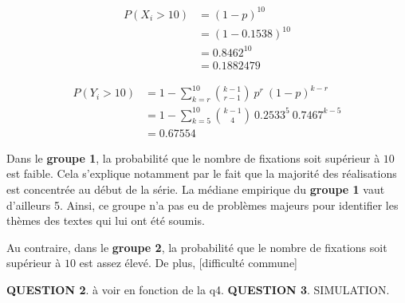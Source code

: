 \documentclass[a4paper,11pt]{article}
\newcommand{\quest}[1]{\small\textbf{#1}\normalsize}
\theoremstyle{nonumberplain}
\theoremstyle{nonumberplain}
\theoremstyle{nonumberplain}
\theoremstyle{nonumberplain}
\begin{document}
          \begin{calculs}
              \vspace{-2ex}
              \begin{equation*}
              \begin{split}
                  P(X_i > 10) & = (1 - p)^{10} \\
                              & = (1 - 0.1538)^{10} \\
                              & = 0.8462^{10} \\
                              & = 0.1882479
              \end{split}
              \end{equation*}

              \begin{equation*}
              \begin{split}
                  P(Y_i > 10) & = 1 - \sum\limits_{k = r}^{10} \binom{k - 1}{r - 1}\ p^r\ (1 - p)^{k - r} \\
                              & = 1 - \sum\limits_{k = 5}^{10} \binom{k - 1}{4}\ 0.2533^5\ 0.7467^{k - 5} \\
                              & = 0.67554
              \end{split}
              \end{equation*}
          \end{calculs}

     \bigskip
     \bigskip
     Dans le \textbf{groupe 1}, la probabilité que le nombre de fixations soit supérieur à $10$ est faible.
     Cela s'explique notamment par le fait que la majorité des réalisations est concentrée au début de la série.
     La médiane empirique du \textbf{groupe 1} vaut d'ailleurs 5. Ainsi, ce groupe n'a pas eu de problèmes majeurs pour
     identifier les thèmes des textes qui lui ont été soumis.

     \bigskip
     Au contraire, dans le \textbf{groupe 2}, la probabilité que le nombre de
     fixations soit supérieur à $10$ est assez élevé. De plus, [difficulté commune]


      \vspace{8cm}
      \quest{QUESTION 2}. à voir en fonction de la q4.
      \quest{QUESTION 3}. SIMULATION.
\end{document}
